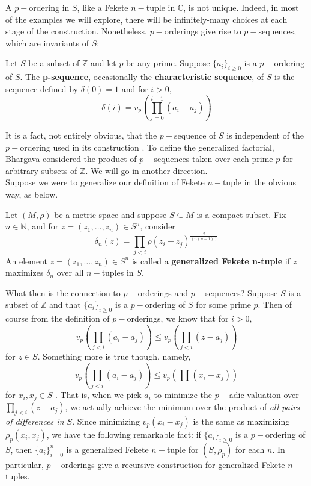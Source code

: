 A $p-$ordering in $S$, like a Fekete $n-$tuple in $\mathbb{C}$, is not unique. Indeed, in most of the examples we will explore, there will be infinitely-many choices at each stage of the construction. Nonetheless, $p-$orderings give rise to $p-$sequences, which are invariants of $S$:\\

\begin{definition}
\cite{mb1} Let $S$ be a subset of $\mathbb{Z}$ and let $p$ be any prime. Suppose $\{a_i\}_{i\geq 0}$ is a $p-$ordering of $S$. The \textbf{p-sequence}, occasionally the \textbf{characteristic sequence}, of $S$ is the sequence defined by $\delta(0)=1$ and for $i > 0,$\[\delta(i) = v_p(\prod_{j=0}^{i-1} (a_i - a_j))\]
\end{definition}

It is a fact, not entirely obvious, that the $p-$sequence of $S$ is independent of the $p-$ordering used in its construction \cite{mb1}. To define the generalized factorial, Bhargava considered the product of $p-$sequences taken over each prime $p$ for arbitrary subsets of $\mathbb{Z}$.  We will go in another direction.\\

Suppose we were to generalize our definition of Fekete $n-$tuple in the obvious way, as below. 

\begin{definition}
Let $(M, \rho)$ be a metric space and suppose $S \subseteq M$ is a compact subset. Fix $n \in \mathbb{N}$, and for $z = (z_1,\ldots,z_n) \in S^n$, consider
\[\delta_n(z) = \prod_{j < i} \rho(z_i - z_j)^{\frac{2}{(n(n-1))}} \]
An element $z = (z_1,\ldots,z_n) \in S^n$ is called a \textbf{generalized Fekete n-tuple} if $z$ maximizes $\delta_n$ over all $n-$tuples in $S$.
\end{definition}
What then is the connection to $p-$orderings and $p-$sequences? Suppose $S$ is a subset of $\mathbb{Z}$ and that $\{a_i\}_{i \geq 0}$ is a $p-$ordering of $S$ for some prime $p$. Then of course from the definition of $p-$orderings, we know that for $i >0$, 
\[ v_p (\prod_{j < i} (a_i - a_j) ) \leq v_p (\prod_{j < i} (z - a_j) )\] for $z \in S$. Something more is true though, namely,
\[ v_p (\prod_{j < i} (a_i - a_j) ) \leq v_p (\prod (x_i - x_j) )\] for $x_i, x_j \in S$ \cite{mb1}.
That is, when we pick $a_i$ to minimize the $p-$adic valuation over $\prod_{j < i} (z - a_j)$, we actually achieve the minimum over the product of \textit{all pairs of differences in $S$}. Since minimizing $v_p(x_i - x_j)$ is the same as maximizing $\rho_p(x_i,x_j)$, we have the following remarkable fact: if $\{a_i\}_{i \geq 0}$ is a $p-$ordering of $S$, then $\{a_i\}_{i=0}^n$ is a generalized Fekete $n-$tuple for $(S,\rho_p)$ for each $n$. In particular, $p-$orderings give a recursive construction for generalized Fekete $n-$tuples.\\   

